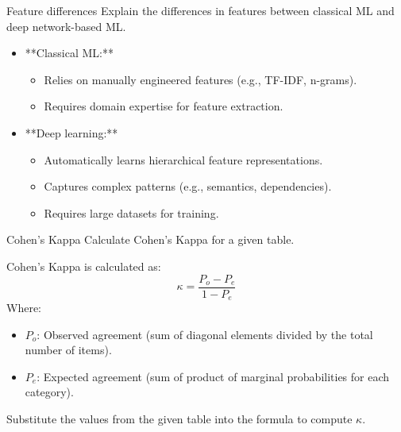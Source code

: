 \documentclass{article}
\begin{document}
\begin{exercise}{Feature differences}
  Explain the differences in features between classical ML and deep network-based ML.

  \begin{solution}
    \begin{itemize}
        \item **Classical ML:**
        \begin{itemize}
            \item Relies on manually engineered features (e.g., TF-IDF, n-grams).
            \item Requires domain expertise for feature extraction.
        \end{itemize}
        \item **Deep learning:**
        \begin{itemize}
            \item Automatically learns hierarchical feature representations.
            \item Captures complex patterns (e.g., semantics, dependencies).
            \item Requires large datasets for training.
        \end{itemize}
    \end{itemize}
  \end{solution}
\end{exercise}

\begin{exercise}{Cohen's Kappa}
  Calculate Cohen's Kappa for a given table.

  \begin{solution}
    Cohen's Kappa is calculated as:
    \[
    \kappa = \frac{P_o - P_e}{1 - P_e}
    \]
    Where:
    \begin{itemize}
        \item \(P_o\): Observed agreement (sum of diagonal elements divided by the total number of items).
        \item \(P_e\): Expected agreement (sum of product of marginal probabilities for each category).
    \end{itemize}
    Substitute the values from the given table into the formula to compute \(\kappa\).
  \end{solution}
\end{exercise}
\end{document}
